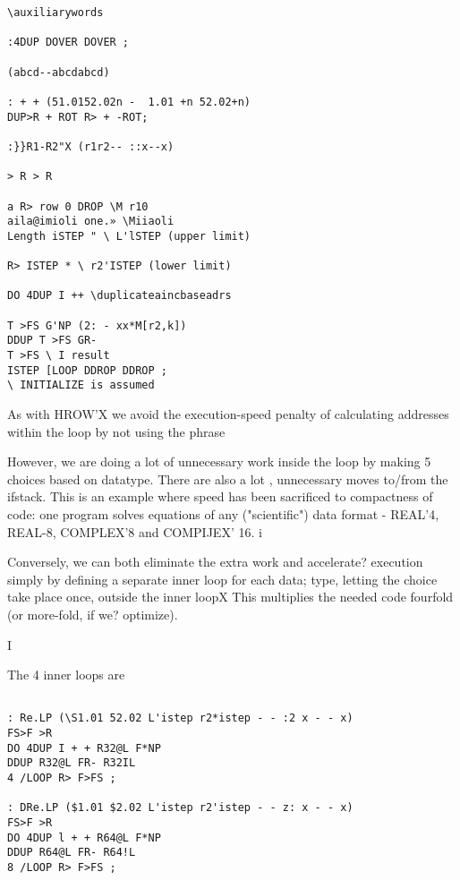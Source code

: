 {{\begin{verbatim}
\auxiliarywords

:4DUP DOVER DOVER ;

(abcd--abcdabcd)

: + + (51.0152.02n -  1.01 +n 52.02+n)
DUP>R + ROT R> + -ROT;

:}}R1-R2"X (r1r2-- ::x--x)

> R > R

a R> row 0 DROP \M r10
aila@imioli one.» \Miiaoli
Length iSTEP " \ L'lSTEP (upper limit)

R> ISTEP * \ r2'ISTEP (lower limit)

DO 4DUP I ++ \duplicateaincbaseadrs

T >FS G'NP (2: - xx*M[r2,k])
DDUP T >FS GR-
T >FS \ I result
ISTEP [LOOP DDROP DDROP ;
\ INITIALIZE is assumed

\end{verbatim} 
As with HROW'X we avoid the execution-speed penalty of
calculating addresses within the loop by not using the phrase




     
  
 
 
 

However, we are doing a lot of unnecessary work inside the loop
by making 5 choices based on datatype. There are also a lot ,
unnecessary moves to/from the ifstack. This is an example where
speed has been sacrificed to compactness of code: one program
solves equations of any ("scientific") data format - REAL'4,
REAL-8, COMPLEX'8 and COMPIJEX' 16. i

Conversely, we can both eliminate the extra work and accelerate?
execution simply by defining a separate inner loop for each data;
type, letting the choice take place once, outside the inner loopX
This multiplies the needed code fourfold (or more-fold, if we?
optimize).

I

The 4 inner loops are
\begin{verbatim}

: Re.LP (\S1.01 52.02 L'istep r2*istep - - :2 x - - x)
FS>F >R
DO 4DUP I + + R32@L F*NP
DDUP R32@L FR- R32IL
4 /LOOP R> F>FS ;

: DRe.LP ($1.01 $2.02 L'istep r2'istep - - z: x - - x)
FS>F >R
DO 4DUP l + + R64@L F*NP
DDUP R64@L FR- R64!L
8 /LOOP R> F>FS ;


\end{verbatim}}}
